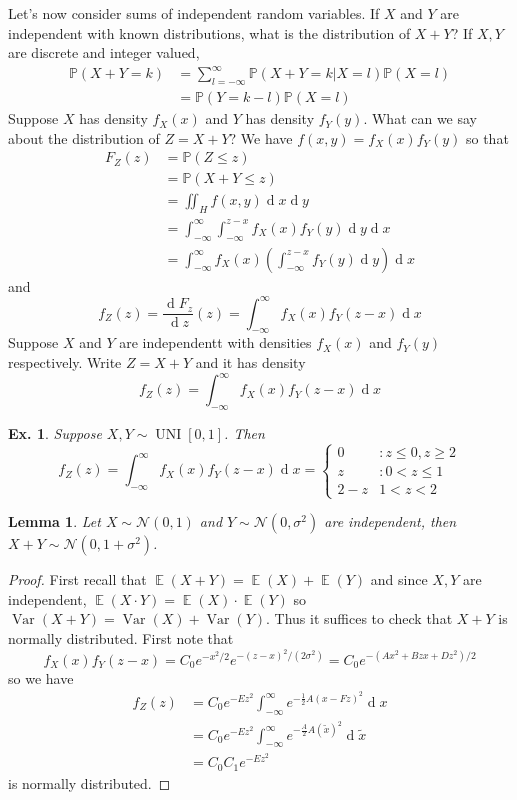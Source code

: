 \documentclass[12pt, a4paper]{book}
\DeclareMathOperator{\E}{\mathbb{E}}
\DeclareMathOperator{\Var}{Var}
\renewcommand{\Pr}{\mathbb{P}}
\renewcommand{\d}[1]{\ensuremath{\operatorname{d}\!{#1}}} %
\newtheorem{lemma}[theorem]{Lemma}
\newtheorem{example}[theorem]{Ex.}
\theoremstyle{nonumberplain}
\newtheorem{proof}{Proof}
\begin{document}
Let's now consider sums of independent random variables.
If $X$ and $Y$ are independent with known distributions, what is the distribution of $X+Y$?
If $X,Y$ are discrete and integer valued,
\begin{align*}
    \Pr(X+Y=k) &= \sum\limits_{l=-\infty}^\infty \Pr(X+Y=k|X=l)\Pr(X=l)\\
               &= \Pr(Y=k-l)\Pr(X=l)
\end{align*}
Suppose $X$ has density $f_X(x)$ and $Y$ has density $f_Y(y)$.
What can we say about the distribution of $Z=X+Y$?
We have $f(x,y)=f_X(x)f_Y(y)$ so that
\begin{align*}
    F_Z(z) &= \Pr(Z\leq z)\\
           &=\Pr(X+Y\leq z)\\
           &= \iint_{H}f(x,y)\d{x}\d{y}\\
           &= \int_{-\infty}^\infty \int_{-\infty}^{z-x}f_X(x)f_Y(y)\d{y}\d{x}\\
           &= \int_{-\infty}^\infty f_X(x)\left(\int_{-\infty}^{z-x}f_Y(y)\d{y}\right)\d{x}
\end{align*}
and
\[f_Z(z)=\frac{\d{F_z}}{\d{z}}(z)=\int_{-\infty}^\infty f_X(x)f_Y(z-x)\d{x}\]
Suppose $X$ and $Y$ are independentt with densities $f_X(x)$ and $f_Y(y)$ respectively.
Write $Z=X+Y$ and it has density
\[f_Z(z)=\int_{-\infty}^\infty f_X(x)f_Y(z-x)\d{x}\]
\begin{example}
    Suppose $X,Y\sim\operatorname{UNI}[0,1]$.
    Then
    \[f_Z(z)=\int_{-\infty}^\infty f_X(x)f_Y(z-x)\d{x}=
        \begin{cases}
            0 &: z\leq 0,z\geq 2\\
            z &: 0<z\leq 1\\
            2-z & 1<z<2
        \end{cases}
    \]
\end{example}
\begin{lemma}
    Let $X\sim\mathcal{N}(0,1)$ and $Y\sim\mathcal{N}(0,\sigma^2)$ are independent, then $X+Y\sim\mathcal{N}(0,1+\sigma^2)$.
\end{lemma}
\begin{proof}
    First recall that $\E(X+Y)=\E(X)+\E(Y)$ and since $X,Y$ are independent, $\E(X\cdot Y)=\E(X)\cdot\E(Y)$ so $\Var(X+Y)=\Var(X)+\Var(Y)$.
    Thus it suffices to check that $X+Y$ is normally distributed.
    First note that
    \[f_X(x)f_Y(z-x)=C_0e^{-x^2/2}e^{-(z-x)^2/(2\sigma^2)}=C_0e^{-(Ax^2+Bzx+Dz^2)/2}\]
    so we have
    \begin{align*}
        f_Z(z) &= C_0e^{-Ez^2}\int_{-\infty}^\infty e^{-\frac{1}{2}A(x-Fz)^2}\d{x}\\
               &= C_0e^{-Ez^2}\int_{-\infty}^\infty e^{-\frac{A}{2}A(\tilde x)^2}\d{\tilde x}\\
               &= C_0C_1e^{-Ez^2}
    \end{align*}
    is normally distributed.
\end{proof}
\end{document}

